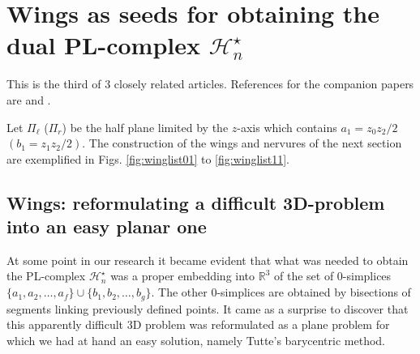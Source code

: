 


\section{Wings as seeds for obtaining the dual PL-complex $\mathcal{H}_n^\star$}

This is the third of 3 closely related articles.
References for the companion papers are \cite{linsmachadoA2012} and \cite{linsmachadoB2012}.

Let $\Pi_\ell$  ($\Pi_r$) be the half plane limited by the $z$-axis 
which contains $a_1=z_0z_2/2$ $(b_1=z_1z_2/2)$.
The construction of the wings and nervures of the next section are exemplified in Figs. \ref{fig:winglist01} to \ref{fig:winglist11}.

\subsection{Wings: reformulating a difficult 3D-problem 
into an easy planar one}\label{subsec:wings}

At some point in our research it became evident that what was needed to obtain the PL-complex $\mathcal{H}_n^\star$ 
was a proper embedding into $\mathbb{R}^3$ of the set of 0-simplices $\{a_1, a_2,\ldots,a_f\} \cup \{b_1, b_2,\ldots,b_g\}$.
The other 0-simplices are obtained by bisections of segments linking previously defined points. It came as a surprise to discover
that this apparently difficult 3D problem was reformulated as a plane problem for which we had at hand an easy solution,
namely Tutte's barycentric method.

